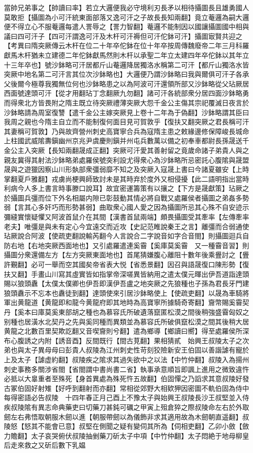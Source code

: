 當帥兄弟事之【帥讀曰率】若立大邏便我必守境利刃長矛以相待攝圖長且雄勇國人莫敢拒【攝圖為小可汗統東面部落又逸可汗之子故長長知兩翻】竟立菴邏為嗣大邏便不得立心不服菴邏每遣人詈辱之【詈力智翻】菴邏不能制因以國讓攝圖國中相與議曰四可汗子【四可汗謂逸可汗及木杆可汗褥但可汗佗鉢可汗】攝圖㝡賢共迎之　【考異曰隋突厥傳云木杆在位二十年卒佗鉢在位十年卒按周傳魏廢帝二年三月科羅獻馬木杆猶未立建德二年佗鉢獻馬然則木杆以承聖二年立太建四年卒佗鉢以其年立十三年卒也】號沙鉢略可汗居都斤山菴邏降居獨洛水稱第二可汗【都斤山獨洛水皆突厥中地名第二可汗言其位次沙鉢略也】大邏便乃謂沙鉢略曰我與爾俱可汗子各承父後爾今極尊我獨無位何也沙鉢略患之以為阿波可汗還領所部又沙鉢略從父玷厥居西面號達頭可汗【從才用翻玷丁念翻厥九勿翻】諸可汗各統部衆分居四面沙鉢略勇而得衆北方皆畏附之隋主既立待突厥禮薄突厥大怨千金公主傷其宗祀覆滅日夜言於沙鉢略請為周室復讐【遣千金公主嫁突厥見上卷十二年為于偽翻】沙鉢略謂其臣曰我周之親也今隋主自立而不能制復何面目見可賀敦乎【復扶又翻突厥之君長稱可汗其妻稱可賀敦】乃與故齊營州刺史高寶寧合兵為寇隋主患之敕緣邊修保障峻長城命上柱國武威隂夀鎭幽州京兆尹虞慶則鎭并州屯兵數萬以備之初奉車都尉長孫晟送千金公主入突厥【長知兩翻晟成正翻】突厥可汗愛其善射留之竟歲命諸子弟貴人與之親友冀得其射法沙鉢略弟處羅侯號突利設尤得衆心為沙鉢略所忌密託心腹隂與晟盟晟與之遊獵因察山川形埶部衆彊弱靡不知之及突厥入寇晟上書曰今諸夏雖安【上時掌翻夏戶雅翻】戎虜尚梗興師致討未是其時弃於度外又相侵擾【此二語明指出當時利病今人多上書言時事滕口說耳】故宜密運籌策有以攘之【下方是晟獻策】玷厥之於攝圖兵彊而位下外名相屬内隙已彰鼓動其情必將自戰又處羅侯者攝圖之弟姦多勢弱【言其心多奸巧而形勢甚弱】曲取衆心國人愛之因為攝圖所忌其心殊不自安迹示彌縫實懷疑懼又阿波首鼠介在其間【漢書首鼠兩端】頗畏攝圖受其牽率【左傳牽率老夫】唯彊是與未有定心今宜遠交而近攻【史記范睢說秦王之言】離彊而合弱通使玷厥說合阿波【使疏吏翻說輸芮翻今人言說合二字說音如字合音閤】則攝圖迴兵自防右地【右地突厥西面地也】又引處羅遣連奚霫【奚庫莫奚霫　又一種霫音習】則攝圖分衆還備左方【左方突厥東面地也】首尾猜嫌腹心離阻十數年後乘舋討之【舋許覲翻】必可一舉而空其國矣帝省表大悦【省悉景翻】因召與語晟復口陳形勢【復扶又翻】手畫山川寫其虛實皆如指掌帝深嗟異皆納用之遣太僕元暉出伊吾道詣達頭賜以狼頭纛【太僕太僕卿也伊吾即漢伊吾盧之地突厥之先狼種也子孫為君長牙門建狼頭纛示不忘本也纛徒到翻】達頭使來引居沙鉢略使上【使疏吏翻】以晟為車騎將軍出黄龍道【黄龍即和龍今黄龍府即其地時為高寶寧所據騎奇寄翻】齎幣賜奚霫契丹【奚本曰庫莫奚東部胡之種也為慕容氏所破遺落竄匿松漠之間後稍強盛霫匈奴之别種也居潢水北契丹之先與奚同種而異類並為慕容氏所破俱竄松漠之間其後稍大居黄龍之北數百里契欺訖翻又音喫齎則兮翻】遣為鄉導【鄉讀曰嚮】得至處羅侯所深布心腹誘之内附【誘音酉】反間既行【間古莧翻】果相猜貳　始興王叔陵太子之次弟也與太子異母母曰彭貴人叔陵為江州刺史性苛刻狡險新安王伯固以善諧謔有寵於上及太子【謔虚約翻】叔陵疾之隂求其過失欲中之以法【中竹仲翻】叔陵入為揚州刺史事務多關涉省閤【省閤謂中書尚書二省】執事承意順旨即諷上進用之微致違忤必抵以大辠重者至殊死【身首異處為殊死忤五故翻】伯固憚之乃謟求其意叔陵好發古冢伯固好射雉【好呼到翻射而亦翻】常相從郊野大相欵狎因密圖不軌伯固為侍中每得密語必告叔陵　十四年春正月己酉上不豫太子與始興王叔陵長沙王叔堅並入侍疾叔陵隂有異志命典藥吏曰切藥刀甚鈍可礪之甲寅上殂倉猝之際叔陵命左右於外取劒左右弗悟取朝服木劒以進【朝服帶劒以為儀飾非求其適用故為木劒朝直遥翻】叔陵怒【怒其不能會已意】叔堅在側聞之疑有變伺其所為【伺相吏翻】乙卯小斂【斂力贍翻】太子哀哭俯伏叔陵抽剉藥刀斫太子中項【中竹仲翻】太子悶絶于地母柳皇后走來救之又斫后數下乳媪